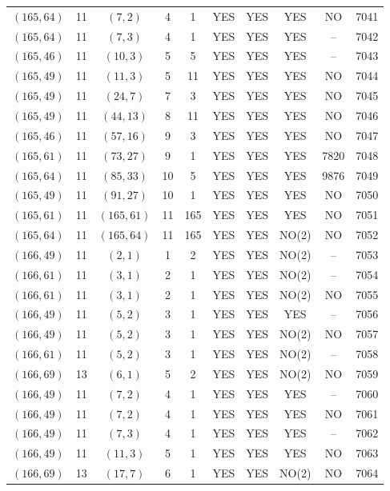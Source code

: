 \begin{longtable}{|c|c|c|c|c|c|c|c|c|c|}
$(165, 64)$ & 11 & $(7, 2)$ & 4 & 1 & YES & YES & YES & NO & 7041\\
$(165, 64)$ & 11 & $(7, 3)$ & 4 & 1 & YES & YES & YES & -- & 7042\\
$(165, 46)$ & 11 & $(10, 3)$ & 5 & 5 & YES & YES & YES & -- & 7043\\
$(165, 49)$ & 11 & $(11, 3)$ & 5 & 11 & YES & YES & YES & NO & 7044\\
$(165, 49)$ & 11 & $(24, 7)$ & 7 & 3 & YES & YES & YES & NO & 7045\\
$(165, 49)$ & 11 & $(44, 13)$ & 8 & 11 & YES & YES & YES & NO & 7046\\
$(165, 46)$ & 11 & $(57, 16)$ & 9 & 3 & YES & YES & YES & NO & 7047\\
$(165, 61)$ & 11 & $(73, 27)$ & 9 & 1 & YES & YES & YES & 7820 & 7048\\
$(165, 64)$ & 11 & $(85, 33)$ & 10 & 5 & YES & YES & YES & 9876 & 7049\\
$(165, 49)$ & 11 & $(91, 27)$ & 10 & 1 & YES & YES & YES & NO & 7050\\
$(165, 61)$ & 11 & $(165, 61)$ & 11 & 165 & YES & YES & YES & NO & 7051\\
$(165, 64)$ & 11 & $(165, 64)$ & 11 & 165 & YES & YES & NO(2) & NO & 7052\\
$(166, 49)$ & 11 & $(2, 1)$ & 1 & 2 & YES & YES & NO(2) & -- & 7053\\
$(166, 61)$ & 11 & $(3, 1)$ & 2 & 1 & YES & YES & NO(2) & -- & 7054\\
$(166, 61)$ & 11 & $(3, 1)$ & 2 & 1 & YES & YES & NO(2) & NO & 7055\\
$(166, 49)$ & 11 & $(5, 2)$ & 3 & 1 & YES & YES & YES & -- & 7056\\
$(166, 49)$ & 11 & $(5, 2)$ & 3 & 1 & YES & YES & NO(2) & NO & 7057\\
$(166, 61)$ & 11 & $(5, 2)$ & 3 & 1 & YES & YES & NO(2) & -- & 7058\\
$(166, 69)$ & 13 & $(6, 1)$ & 5 & 2 & YES & YES & NO(2) & NO & 7059\\
$(166, 49)$ & 11 & $(7, 2)$ & 4 & 1 & YES & YES & YES & -- & 7060\\
$(166, 49)$ & 11 & $(7, 2)$ & 4 & 1 & YES & YES & YES & NO & 7061\\
$(166, 49)$ & 11 & $(7, 3)$ & 4 & 1 & YES & YES & YES & -- & 7062\\
$(166, 49)$ & 11 & $(11, 3)$ & 5 & 1 & YES & YES & YES & NO & 7063\\
$(166, 69)$ & 13 & $(17, 7)$ & 6 & 1 & YES & YES & NO(2) & NO & 7064\\

\end{longtable}
